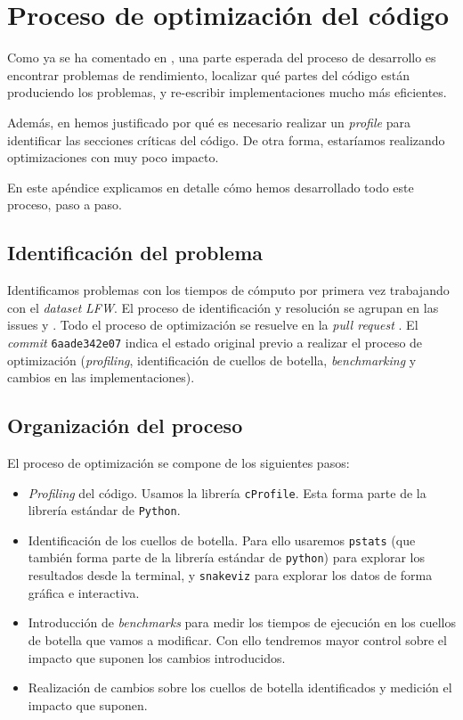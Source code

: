\chapter{Proceso de optimización del código}  \label{apendice:optimizacion_codigo}

Como ya se ha comentado en , una parte esperada del proceso de desarrollo es encontrar problemas de rendimiento, localizar qué partes del código están produciendo los problemas, y re-escribir implementaciones mucho más eficientes.

Además, en  hemos justificado por qué es necesario realizar un \textit{profile} para identificar las secciones críticas del código. De otra forma, estaríamos realizando optimizaciones con muy poco impacto.

En este apéndice explicamos en detalle cómo hemos desarrollado todo este proceso, paso a paso.

\section{Identificación del problema}

Identificamos problemas con los tiempos de cómputo por primera vez trabajando con el \textit{dataset} \textit{LFW}. El proceso de identificación y resolución se agrupan en las issues \cite{informatica:issue35_profiling} y \cite{informatica:issue36_slowmetrics}. Todo el proceso de optimización se resuelve en la \textit{pull request} \cite{informatica:pr42_profiling}. El \textit{commit} \lstinline{6aade342e07} \cite{informatica:commit_base_optimizacion} indica el estado original previo a realizar el proceso de optimización (\textit{profiling}, identificación de cuellos de botella, \textit{benchmarking} y cambios en las implementaciones).

\section{Organización del proceso}

El proceso de optimización se compone de los siguientes pasos:

\begin{itemize}
	\item \textit{Profiling} del código. Usamos la librería \lstinline{cProfile}. Esta forma parte de la librería estándar de \lstinline{Python}.
	\item Identificación de los cuellos de botella. Para ello usaremos \lstinline{pstats} (que también forma parte de la librería estándar de \lstinline{python}) para explorar los resultados desde la terminal, y \lstinline{snakeviz} para explorar los datos de forma gráfica e interactiva.
	\item Introducción de \textit{benchmarks} para medir los tiempos de ejecución en los cuellos de botella que vamos a modificar. Con ello tendremos mayor control sobre el impacto que suponen los cambios introducidos.
	\item Realización de cambios sobre los cuellos de botella identificados y medición el impacto que suponen.
\end{itemize}

